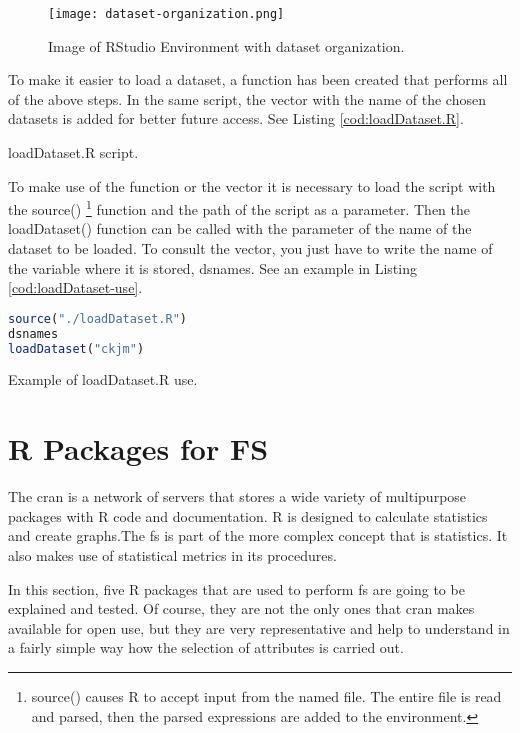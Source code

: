 \begin{figure}[H]
    \centering
    \texttt{[image: dataset-organization.png]}
    \caption{Image of RStudio Environment with dataset organization.}
    \label{fig:dataset-organization}
\end{figure}

To make it easier to load a dataset, a function has been created that performs all of the above steps. In the same script, the vector with the name of the chosen datasets is added for better future access. See Listing \ref{cod:loadDataset.R}.

\begin{codefloat}[H]

\caption{loadDataset.R script.}
\label{cod:loadDataset.R}
\end{codefloat}

To make use of the function or the vector it is necessary to load the script with the source() \footnote{source() causes R to accept input from the named file. The entire file is read and parsed, then the parsed expressions are added to the environment.} function and the path of the script as a parameter. Then the loadDataset() function can be called with the parameter of the name of the dataset to be loaded. To consult the vector, you just have to write the name of the variable where it is stored, dsnames. See an example in Listing \ref{cod:loadDataset-use}.

\begin{codefloat}[H]
\begin{lstlisting}[language=R, style=Ccolor]
source("./loadDataset.R")
dsnames
loadDataset("ckjm")
\end{lstlisting}
\caption{Example of loadDataset.R use.}
\label{cod:loadDataset-use}
\end{codefloat}

\section{R Packages for FS}
\label{sec:r-packages-fs}

The \acrfull{cran} is a network of servers that stores a wide variety of multipurpose packages with R code and documentation. R is designed to calculate statistics and create graphs.The \acrlong{fs} is part of the more complex concept that is statistics. It also makes use of statistical metrics in its procedures.

In this section, five R packages that are used to perform \acrshort{fs} are going to be explained and tested. Of course, they are not the only ones that \acrshort{cran} makes available for open use, but they are very representative and help to understand in a fairly simple way how the selection of attributes is carried out.

